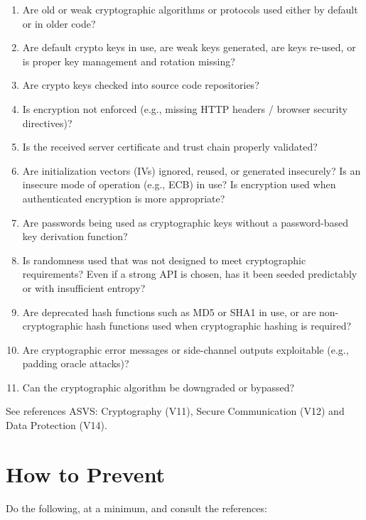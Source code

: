 \documentclass[11pt]{article}
\begin{document}
\begin{enumerate}
  \item Are old or weak cryptographic algorithms or protocols used either by default or in older code?
  \item Are default crypto keys in use, are weak keys generated, are keys re-used, or is proper key management and rotation missing?
  \item Are crypto keys checked into source code repositories?
  \item Is encryption not enforced (e.g., missing HTTP headers / browser security directives)?
  \item Is the received server certificate and trust chain properly validated?
  \item Are initialization vectors (IVs) ignored, reused, or generated insecurely? Is an insecure mode of operation (e.g., ECB) in use? Is encryption used when authenticated encryption is more appropriate?
  \item Are passwords being used as cryptographic keys without a password-based key derivation function?
  \item Is randomness used that was not designed to meet cryptographic requirements? Even if a strong API is chosen, has it been seeded predictably or with insufficient entropy?
  \item Are deprecated hash functions such as MD5 or SHA1 in use, or are non-cryptographic hash functions used when cryptographic hashing is required?
  \item Are cryptographic error messages or side-channel outputs exploitable (e.g., padding oracle attacks)?
  \item Can the cryptographic algorithm be downgraded or bypassed?
\end{enumerate}

See references ASVS: Cryptography (V11), Secure Communication (V12) and Data Protection (V14).

\section{How to Prevent}
Do the following, at a minimum, and consult the references:
\end{document}
